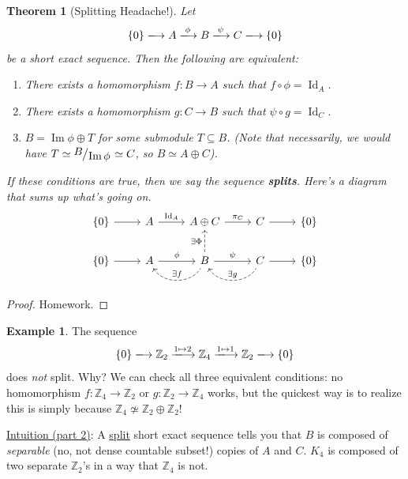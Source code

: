 \documentclass[12pt]{article}
\newcommand{\z}{\mathbb{Z}}
\newcommand{\ita}[1]{\textit{#1}}
\newcommand{\quotient}[2]{{\makebox[\width-2.3pt][l]{\raisebox{.2em}{$#1$}}\left/\raisebox{-.2em}{$#2$}\right.}}
\newtheorem{theorem}{Theorem}[section]
\theoremstyle{definition}
\newtheorem{example}{Example}[section]
\DeclareMathOperator\Id{Id}
\DeclareMathOperator\im{Im}
\begin{document}
\begin{theorem}[Splitting Headache!]
    Let 
    \begin{equation}
        \{0\}\xlongrightarrow{} A\xlongrightarrow{\phi}B\xlongrightarrow{\psi}C\xlongrightarrow{}\{0\}
    \end{equation}
    be a short exact sequence. Then the following are equivalent:
    \begin{enumerate}
        \item There exists a homomorphism $f:B\to A$ such that $f\circ\phi=\Id_A$.
        \item There exists a homomorphism $g:C\to B$ such that $\psi\circ g=\Id_C$.
        \item $B=\im\phi\oplus T$ for some submodule $T\subseteq B$. (Note that necessarily, we would have $T\simeq\quotient{B}{\im\phi}\simeq C$, so $B\simeq A\oplus C$). 
    \end{enumerate}
    If these conditions are true, then we say the sequence \textbf{splits}. Here's a diagram that sums up what's going on.
    \begin{equation}
        \begin{tikzcd}
            \{0\}\arrow[r] & A\arrow[r,"\Id_A"]  & A\oplus C\arrow[r,"\pi_C"] & C\arrow[r] & \{0\}\\
            \{0\}\arrow[r] &  A\arrow[r,"\phi"]\arrow[r,dashleftarrow, "\exists f", bend right=60] & B\arrow[r,"\psi"]\arrow[u,dashrightarrow, "\exists\Phi"]\arrow[r,dashleftarrow, "\exists g", bend right=60] & C\arrow[r] & \{0\}
        \end{tikzcd}
    \end{equation}
\end{theorem}
\begin{proof}
    Homework.
\end{proof}
\begin{example}
    The sequence 
    \begin{equation}
        \{0\}\xlongrightarrow{} \z_2\xlongrightarrow{1\mapsto2}\z_4\xlongrightarrow{1\mapsto1}\z_2\xlongrightarrow{}\{0\}
    \end{equation}
    does \ita{not} split. Why? We can check all three equivalent conditions: no homomorphism $f:\z_4\to\z_2$ or $g:\z_2\to\z_4$ works, but the quickest way is to realize this is simply because $\z_4\not\simeq\z_2\oplus\z_2$!
\end{example}
\noindent\underline{Intuition (part 2)}: A \underline{split} short exact sequence tells you that $B$ is composed of \ita{separable} (no, not dense countable subset!) copies of $A$ and $C$. $K_4$ is composed of two separate $\z_2$'s in a way that $\z_4$ is not.
\end{document}
